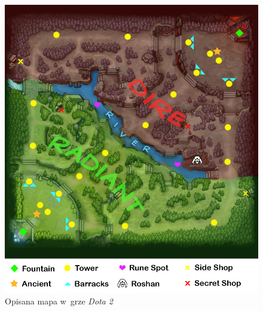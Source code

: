 \documentclass{article}
\begin{document}
\begin{figure}[H]
\includegraphics[width=\textwidth]{dota2_map.png}
\caption[Opisana mapa w~grze \textit{Dota 2}]{Opisana mapa w~grze \textit{Dota 2} \cite{dota2_map_src}} 
\label{dota2_map}
\end{figure}
\end{document}
